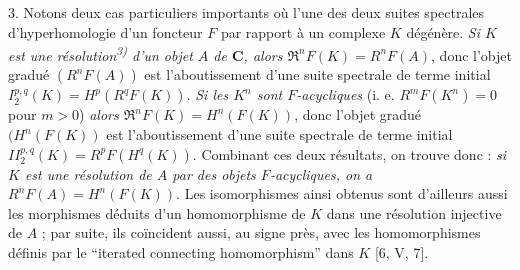 3. Notons deux cas particuliers importants où l'une des deux suites
spectrales d'hyperhomologie d'un foncteur $F$ par rapport à un complexe $K$
dégénère. \textit{Si $K$ est une résolution\textsuperscript{\textup{3)}} d'un objet
$A$ de $\mathbf{C}$, alors $\mathfrak R^nF(K)=R^nF(A)$}, donc l'objet gradué
$(R^nF(A))$ est l'aboutissement d'une suite spectrale de terme initial
$I_2^{p,q}(K)=H^p(R^qF(K))$. \textit{Si les $K^n$ sont
$F$-acycliques} (i. e. $R^mF(K^n)=0$ pour $m>0$) \textit{alors
$\mathfrak R^nF(K)=H^n(F(K))$}, donc l'objet gradué $(H^n(F(K))$ est
l'aboutissement d'une suite spectrale de terme initial
$II_2^{p,q}(K)=R^pF(H^q(K))$. Combinant ces deux résultats, on
trouve donc : \textit{si $K$ est une résolution de $A$ par des objets
$F$-acycliques, on a $R^nF(A)=H^n(F(K))$}. Les isomorphismes ainsi obtenus sont
d'ailleurs aussi les morphismes déduits d'un homomorphisme de $K$ dans une
résolution injective de $A$ ; par suite, ils coïncident aussi, au signe près,
avec les homomorphismes définis par le ``iterated connecting homomorphism''
dans $K$ [6, V, 7].

